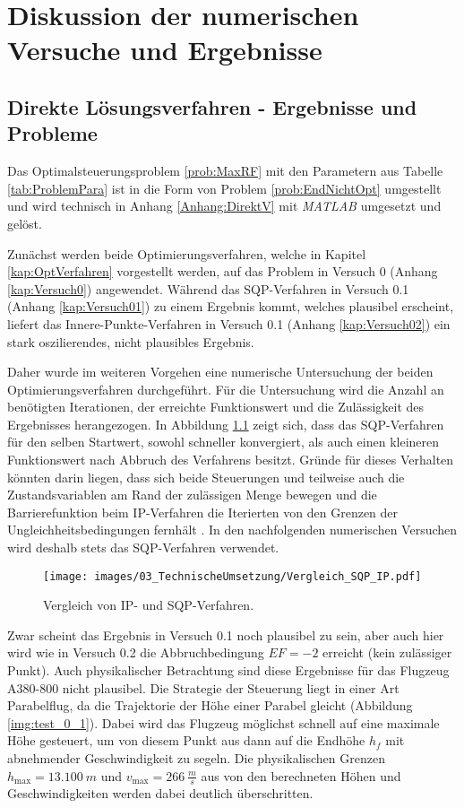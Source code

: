 \chapter{Diskussion der numerischen Versuche und Ergebnisse}\label{kap:LSG}

\section{Direkte Lösungsverfahren - Ergebnisse und Probleme}
Das Optimalsteuerungsproblem \ref{prob:MaxRF} mit den Parametern aus Tabelle \ref{tab:ProblemPara} ist in die Form von Problem \ref{prob:EndNichtOpt} umgestellt und wird technisch in Anhang \ref{Anhang:DirektV} mit \textit{MATLAB} umgesetzt und gelöst.

Zunächst werden beide Optimierungsverfahren, welche in Kapitel \ref{kap:OptVerfahren} vorgestellt werden, auf das Problem in Versuch 0 (Anhang \ref{kap:Versuch0}) angewendet. Während das SQP-Verfahren in Versuch 0.1 (Anhang \ref{kap:Versuch01}) zu einem Ergebnis kommt, welches plausibel erscheint, liefert das Innere-Punkte-Verfahren in Versuch 0.1 (Anhang \ref{kap:Versuch02}) ein stark oszilierendes, nicht plausibles Ergebnis.

Daher wurde im weiteren Vorgehen eine numerische Untersuchung der beiden Optimierungsverfahren durchgeführt. Für die Untersuchung wird die Anzahl an benötigten Iterationen, der erreichte Funktionswert und die Zulässigkeit des Ergebnisses herangezogen. In Abbildung \ref{img:Vergleich_SQP_IP} zeigt sich, dass das SQP-Verfahren für den selben Startwert, sowohl schneller konvergiert, als auch einen kleineren Funktionswert nach Abbruch des Verfahrens besitzt. Gründe für dieses Verhalten könnten darin liegen, dass sich beide Steuerungen und teilweise auch die Zustandsvariablen am Rand der zulässigen Menge bewegen und die Barrierefunktion beim IP-Verfahren die Iterierten von den Grenzen der Ungleichheitsbedingungen fernhält \cite{Matlab2016}. In den nachfolgenden numerischen Versuchen wird deshalb stets das SQP-Verfahren verwendet.

\begin{figure}[htbp]
    \begin{center}
        \texttt{[image: images/03\_TechnischeUmsetzung/Vergleich\_SQP\_IP.pdf]}
        \caption{Vergleich von IP- und SQP-Verfahren.}\label{img:Vergleich_SQP_IP}
    \end{center}
\end{figure}

Zwar scheint das Ergebnis in Versuch 0.1 noch plausibel zu sein, aber auch hier wird wie in Versuch 0.2 die Abbruchbedingung $EF = -2$ erreicht (kein zulässiger Punkt). Auch physikalischer Betrachtung sind diese Ergebnisse für das Flugzeug A380-800 nicht plausibel. Die Strategie der Steuerung liegt in einer Art Parabelflug, da die Trajektorie der Höhe einer Parabel gleicht (Abbildung \ref{img:test_0_1}). Dabei wird das Flugzeug möglichst schnell auf eine maximale Höhe gesteuert, um von diesem Punkt aus dann auf die Endhöhe $h_f$ mit abnehmender Geschwindigkeit zu segeln. Die physikalischen Grenzen $h_{\max} = 13.100 \ m$ und $v_{\max} = 266 \ \frac{m}{s}$ aus \cite{A380Tech} von den berechneten Höhen und Geschwindigkeiten werden dabei deutlich überschritten.

